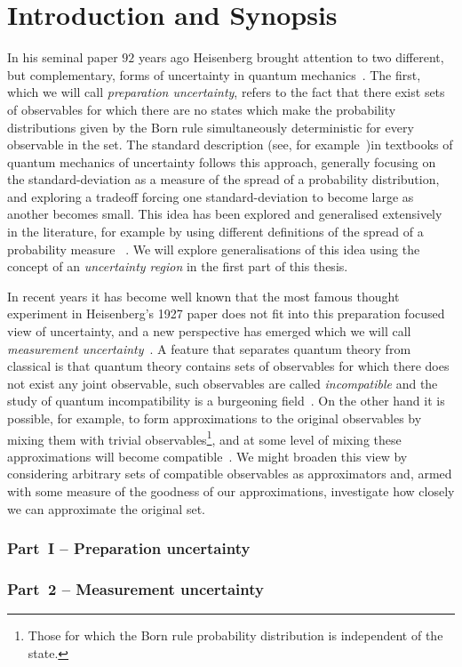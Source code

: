 \let\textcircled=\pgftextcircled
\chapter{Introduction and Synopsis}
\label{chap:intro}

In his seminal paper $92$ years ago Heisenberg brought attention to two different, but complementary, forms of uncertainty in quantum mechanics~\cite{Heisenberg1927-Wheeler+Zurek}. The first, which we will call \emph{preparation uncertainty}, refers to the fact that there exist sets of observables for which there are no states which make the probability distributions given by the Born rule simultaneously deterministic for every observable in the set. The standard description (see, for example~\cite{griffiths2005introduction})in textbooks of quantum mechanics of uncertainty follows this approach, generally focusing on the standard-deviation as a measure of the spread of a probability distribution, and exploring a tradeoff forcing one standard-deviation to become large as another becomes small. This idea has been explored and generalised extensively in the literature, for example by using different definitions of the spread of a probability measure~\cites{MaassenUffink1988}  \cites{doi:10.1063/1.3614503}{doi:10.1063/1.2759831}. We will explore generalisations of this idea using the concept of an \emph{uncertainty region} in the first part of this thesis.

In recent years it has become well known that the most famous thought experiment in Heisenberg's 1927 paper does not fit into this preparation focused view of uncertainty, and a new perspective has emerged which we will call \emph{measurement uncertainty}~\cites{PhysRevLett.111.160405}{blw-meas-uncertainty}{6773660Werner:2004:URJ:2011593.2011606}. A feature that separates quantum theory from classical is that quantum theory contains sets of observables for which there does not exist any joint observable, such observables are called \emph{incompatible} and the study of quantum incompatibility is a burgeoning field~\cites{Heinosaari_2016}{PhysRevLett.122.130402}{Heinosaari_2017}{PhysRevA.96.052127}. On the other hand it is possible, for example, to form approximations to the original observables by mixing them with trivial observables\footnote{Those for which the Born rule probability distribution is independent of the state.}, and at some level of mixing these approximations will become compatible~\cite{PhysRevA.87.052125}. We might broaden this view by considering arbitrary sets of compatible observables as approximators and, armed with some measure of the goodness of our approximations, investigate how closely we can approximate the original set.


\subsection*{Part~I -- Preparation uncertainty}



\subsection*{Part~2 -- Measurement uncertainty}

